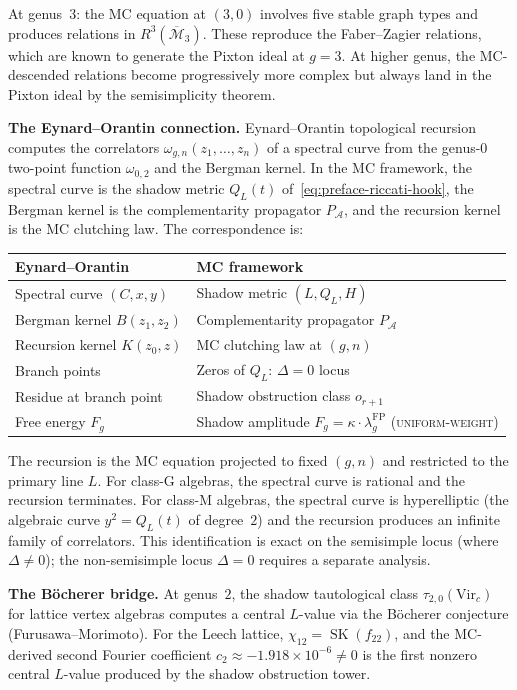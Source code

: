 \documentclass[11pt,reqno]{amsart}
\theoremstyle{definition}
\theoremstyle{remark}
\providecommand{\cA}{\mathcal{A}}
\providecommand{\cM}{\mathcal{M}}
\numberwithin{equation}{section}
\begin{document}
At genus~$3$: the MC equation at $(3,0)$ involves five stable graph
types and produces relations in $R^3(\overline{\cM}_3)$. These
reproduce the Faber--Zagier relations, which are known to generate
the Pixton ideal at $g=3$. At higher genus, the MC-descended
relations become progressively more complex but always land in the
Pixton ideal by the semisimplicity theorem.

\medskip
\noindent\textbf{The Eynard--Orantin connection.}\enspace
Eynard--Orantin topological recursion computes the correlators
$\omega_{g,n}(z_1,\ldots,z_n)$ of a spectral curve from the
genus-$0$ two-point function $\omega_{0,2}$ and the Bergman kernel.
In the MC framework, the spectral curve is the shadow metric $Q_L(t)$
of~\eqref{eq:preface-riccati-hook}, the Bergman kernel is the
complementarity propagator $P_\cA$, and the recursion kernel is the
MC clutching law. The correspondence is:
\begin{center}
\small
\renewcommand{\arraystretch}{1.15}
\begin{tabular}{ll}
\textbf{Eynard--Orantin} & \textbf{MC framework}\\
\hline
Spectral curve $(C,x,y)$ & Shadow metric $(L,Q_L,H)$\\[1pt]
Bergman kernel $B(z_1,z_2)$ & Complementarity propagator $P_\cA$\\[1pt]
Recursion kernel $K(z_0,z)$ & MC clutching law at $(g,n)$\\[1pt]
Branch points & Zeros of $Q_L$: $\Delta=0$ locus\\[1pt]
Residue at branch point & Shadow obstruction class $o_{r+1}$\\[1pt]
Free energy $F_g$ & Shadow amplitude $F_g=\kappa\cdot\lambda_g^{\mathrm{FP}}$ \textsc{(uniform-weight)}
\end{tabular}
\end{center}
The recursion is the MC equation projected to fixed $(g,n)$ and
restricted to the primary line $L$. For class-G algebras, the
spectral curve is rational and the recursion terminates. For
class-M algebras, the spectral curve is hyperelliptic (the algebraic
curve $y^2=Q_L(t)$ of degree~$2$) and the recursion produces an
infinite family of correlators. This identification is exact on the
semisimple locus (where $\Delta\neq 0$); the non-semisimple locus
$\Delta=0$ requires a separate analysis.

\medskip
\noindent\textbf{The B\"ocherer bridge.}\enspace
At genus~$2$, the shadow tautological class $\tau_{2,0}(\mathrm{Vir}_c)$
for lattice vertex algebras computes a central $L$-value via the
B\"ocherer conjecture (Furusawa--Morimoto). For the Leech lattice,
$\chi_{12}=\operatorname{SK}(f_{22})$, and the MC-derived second
Fourier coefficient $c_2\approx-1.918\times 10^{-6}\neq 0$ is the
first nonzero central $L$-value produced by the shadow obstruction
tower.
\end{document}
